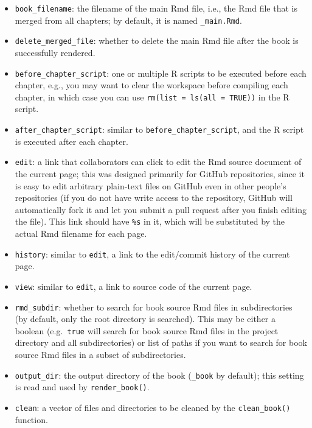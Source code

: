 \documentclass[
  12pt,
]{krantz}
\providecommand{\tightlist}{%
  \setlength{\itemsep}{0pt}\setlength{\parskip}{0pt}}
\begin{document}
\begin{itemize}
\tightlist
\item
  \texttt{book\_filename}: the filename of the main Rmd file, i.e., the Rmd file that is merged from all chapters; by default, it is named \texttt{\_main.Rmd}.
\item
  \texttt{delete\_merged\_file}: whether to delete the main Rmd file after the book is successfully rendered.
\item
  \texttt{before\_chapter\_script}: one or multiple R scripts to be executed before each chapter, e.g., you may want to clear the workspace before compiling each chapter, in which case you can use \texttt{rm(list\ =\ ls(all\ =\ TRUE))} in the R script.
\item
  \texttt{after\_chapter\_script}: similar to \texttt{before\_chapter\_script}, and the R script is executed after each chapter.
\item
  \texttt{edit}: a link that collaborators can click to edit the Rmd source document of the current page; this was designed primarily for GitHub repositories, since it is easy to edit arbitrary plain-text files on GitHub even in other people's repositories (if you do not have write access to the repository, GitHub will automatically fork it and let you submit a pull request after you finish editing the file). This link should have \texttt{\%s} in it, which will be substituted by the actual Rmd filename for each page.
\item
  \texttt{history}: similar to \texttt{edit}, a link to the edit/commit history of the current page.
\item
  \texttt{view}: similar to \texttt{edit}, a link to source code of the current page.
\item
  \texttt{rmd\_subdir}: whether to search for book source Rmd files in subdirectories (by default, only the root directory is searched). This may be either a boolean (e.g.~\texttt{true} will search for book source Rmd files in the project directory and all subdirectories) or list of paths if you want to search for book source Rmd files in a subset of subdirectories.
\item
  \texttt{output\_dir}: the output directory of the book (\texttt{\_book} by default); this setting is read and used by \texttt{render\_book()}.
\item
  \texttt{clean}: a vector of files and directories to be cleaned by the \texttt{clean\_book()} function.
\end{itemize}
\end{document}
